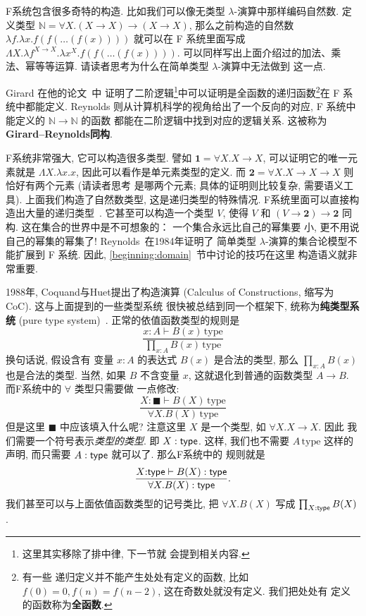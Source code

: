 F系统包含很多奇特的构造. 比如我们可以像无类型
\(\lambda\)-演算中那样编码自然数. 定义类型
\(\mathbb N = \forall X. (X \to X) \to (X \to X)\),
那么之前构造的自然数 \(\lambda f. \lambda x. f(f(\dots(f(x))))\)
就可以在 F 系统里面写成
\(\Lambda X. \lambda f^{X\to X}. \lambda x^X. f(f(\dots(f(x))))\).
可以同样写出上面介绍过的加法、乘法、幂等等运算.
请读者思考为什么在简单类型 \(\lambda\)-演算中无法做到
这一点.

Girard 在他的论文~\cite{girard:1972:systemf}中
证明了二阶逻辑\footnote{这里其实移除了排中律, 下一节就
会提到相关内容.}中可以证明是全函数的递归函数\footnote{有一些
递归定义并不能产生处处有定义的函数, 比如 \(f(0) = 0,
f(n) = f(n-2)\), 这在奇数处就没有定义. 我们把处处有
定义的函数称为\textbf{全函数}.}在 F 系统中都能定义.
Reynolds 则从计算机科学的视角给出了一个反向的对应,
F 系统中能定义的 \(\mathbb N \to \mathbb N\) 的函数
都能在二阶逻辑中找到对应的逻辑关系. 这被称为
\textbf{Girard--Reynolds同构}.

F系统非常强大, 它可以构造很多类型. 譬如 \(\mathbf 1 =
\forall X. X \to X\), 可以证明它的唯一元素就是 \(\Lambda X. \lambda x. x\),
因此可以看作是单元素类型的定义. 而 \(\mathbf 2 =
\forall X. X \to X \to X\) 则恰好有两个元素 (请读者思考
是哪两个元素; 具体的证明则比较复杂, 需要语义工具).
上面我们构造了自然数类型, 这是递归类型的特殊情况.
F系统里面可以直接构造出大量的递归类型~\cite{wadler:1990:free}.
它甚至可以构造一个类型 \(V\),
使得 \(V\) 和 \((V \to \mathbf 2) \to \mathbf 2\) 同构.
这在集合的世界中是不可想象的： 一个集合永远比自己的幂集要
小, 更不用说自己的幂集的幂集了!
Reynolds~\cite{reynolds:1984:polymorphism}在1984年证明了
简单类型 \(\lambda\)-演算的集合论模型不能扩展到 F 系统.
因此, \ref{beginning:domain}~节中讨论的技巧在这里
构造语义就非常重要.

1988年, Coquand与Huet提出了构造演算 (Calculus of
Constructions, 缩写为 CoC). 这与上面提到的一些类型系统
很快被总结到同一个框架下, 统称为\textbf{纯类型系统}
(pure type system)~\cite{barendregt:1992:lambda}.
正常的依值函数类型的规则是
\[\frac{x{:}A \vdash B(x)\,\text{type}}{\prod_{x:A}B(x)\,\text{type}}\]
换句话说, 假设含有
变量 \(x : A\) 的表达式 \(B(x)\) 是合法的类型,
那么 \(\prod_{x:A}B(x)\) 也是合法的类型. 当然,
如果 \(B\) 不含变量 \(x\), 这就退化到普通的函数类型
\(A \to B\). 而F系统中的 \(\forall\) 类型只需要做
一点修改:
\[\frac{X{:} \blacksquare \vdash B(X)\,\text{type}}{\forall X. B(X)\,\text{type}}\]
但是这里 \(\blacksquare\) 中应该填入什么呢? 注意这里
\(X\) 是一个类型, 如 \(\forall X. X \to X\). 因此
我们需要一个符号表示\emph{类型的类型}. 即 \(X : \textsf{type}\).
这样, 我们也不需要 \(A\,\text{type}\) 这样的声明,
而只需要 \(A : \textsf{type}\) 就可以了. 那么F系统中的
规则就是
\[\frac{X{:}\textsf{type} \vdash B(X):\textsf{type}}{\forall X. B(X) : \textsf{type}}.\]
我们甚至可以与上面依值函数类型的记号类比, 把 \(\forall X. B(X)\)
写成 \(\prod_{X : \textsf{type}} B(X)\).

